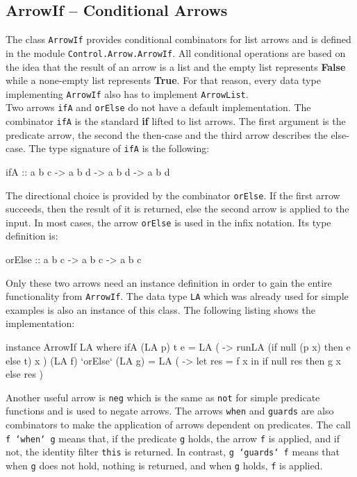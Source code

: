 \documentclass[11pt,a4paper,headsepline, bibtotoc]{scrreprt}
\begin{document}
\subsection{ArrowIf -- Conditional Arrows} \label{arrowif}
The class \texttt{ArrowIf} provides conditional combinators for list arrows and is defined in the module \texttt{Control.Arrow.ArrowIf}. All conditional operations are based on the idea that the result of an arrow is a list and the empty list represents \textbf{False} while a none-empty list represents \textbf{True}. For that reason, every data type implementing \texttt{ArrowIf} also has to implement \texttt{ArrowList}.\\
Two arrows \texttt{ifA} and \texttt{orElse} do not have a default implementation. The combinator \texttt{ifA} is the standard \textbf{if} lifted to list arrows. The first argument is the predicate arrow, the second the then-case and the third arrow describes the else-case. The type signature of \texttt{ifA} is the following:
\begin{code}
ifA :: a b c -> a b d -> a b d -> a b d
\end{code}
The directional choice is provided by the combinator \texttt{orElse}. If the first arrow succeeds, then the result of it is returned, else the second arrow is applied to the input. In most cases, the arrow \texttt{orElse} is used in the infix notation. Its type definition is:
\begin{code}
orElse :: a b c -> a b c -> a b c
\end{code}
Only these two arrows need an instance definition in order to gain the entire functionality from \texttt{ArrowIf}. The data type \texttt{LA} which was already used for simple examples is also an instance of this class. The following listing shows the implementation:
\begin{code}[caption=LA Implementation of ArrowIf]
instance ArrowIf LA where
  ifA (LA p) t e 
    = LA ( \x -> runLA (if null (p x) then e else t) x )
  (LA f) `orElse` (LA g)
    = LA ( \x -> let res = f x in
            if null res then g x else res )
\end{code}
Another useful arrow is \texttt{neg} which is the same as \texttt{not} for simple predicate functions and is used to negate arrows. The arrows \texttt{when} and \texttt{guards} are also combinators to make the application of arrows dependent on predicates. The call  \texttt{f `when` g} means that, if the predicate \texttt{g} holds, the arrow \texttt{f} is applied, and if not, the identity filter \texttt{this} is returned. In contrast, \texttt{g `guards` f} means that when \texttt{g} does not hold, nothing is returned, and when \texttt{g} holds, \texttt{f} is applied.\\
\end{document}
